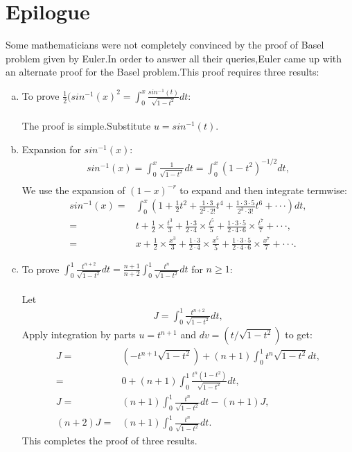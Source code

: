 \documentclass[a4paper,reqno,11pt]{book}
\theoremstyle{plain}%
\theoremstyle{definition}
\begin{document}
\section{Epilogue}
Some mathematicians were not completely convinced by the proof of Basel problem given by Euler.In order to answer all their queries,Euler came up with an alternate proof for the Basel problem.This proof requires three results:
\begin{enumerate}[(a)]
\item To prove $\frac{1}{2}(sin^{-1}(x)^2=\int_{0}^{x}\frac{sin^{-1}(t)}{\sqrt{1-t^2}}dt$:\\
\\
The proof is simple.Substitute $u=sin^{-1}(t)$.
\item Expansion for $sin^{-1}(x)$:
\begin{eqnarray*}
sin^{-1}(x)=\int_{0}^{x}\frac{1}{\sqrt{1-t^2}}dt=\int_{0}^{x}(1-t^2)^{-1/2}dt,\\
\end{eqnarray*}
We use the expansion of $(1-x)^{-r}$ to expand and then integrate termwise:
\begin{align*}
sin^{-1}(x)=&\int_{0}^{x}\left(1+\frac{1}{2}t^2+\frac{1\cdot3}{2^2\cdot2!}t^4+\frac{1\cdot3\cdot5}{2^3\cdot3!}t^6+\cdot\cdot\cdot\right)dt,\\
=&t+\frac{1}{2}\times\frac{t^3}{3}+\frac{1\cdot3}{2\cdot4}\times\frac{t^5}{5}+\frac{1\cdot3\cdot5}{2\cdot4\cdot6}\times\frac{t^7}{7}+\cdot\cdot\cdot,\\
=&x+\frac{1}{2}\times\frac{x^3}{3}+\frac{1\cdot3}{2\cdot4}\times\frac{x^5}{5}+\frac{1\cdot3\cdot5}{2\cdot4\cdot6}\times\frac{x^7}{7}+\cdot\cdot\cdot.
\end{align*}
\item To prove $\int_{0}^{1}\frac{t^{n+2}}{\sqrt{1-t^2}}dt=\frac{n+1}{n+2}\int_{0}^{1}\frac{t^{n}}{\sqrt{1-t^2}}dt$ for $n\geq1$:\\
\\
Let
\begin{eqnarray*}
    J=\int_{0}^{1}\frac{t^{n+2}}{\sqrt{1-t^2}}dt,
\end{eqnarray*}
Apply integration by parts $u=t^{n+1}$ and $dv=(t/\sqrt{1-t^2})$ to get:
\begin{align*}
    J=&(-t^{n+1}\sqrt{1-t^2})+(n+1)\int_{0}^{1}t^n\sqrt{1-t^2}dt,\\
     =&0+(n+1)\int_{0}^{1}\frac{t^n(1-t^2)}{\sqrt{1-t^2}}dt,\\
    J=&(n+1)\int_{0}^{1}\frac{t^n}{\sqrt{1-t^2}}dt-(n+1)J,\\
    (n+2)J=&(n+1)\int_{0}^{1}\frac{t^n}{\sqrt{1-t^2}}dt.
\end{align*}
This completes the proof of three results.
\end{enumerate}
\end{document}
